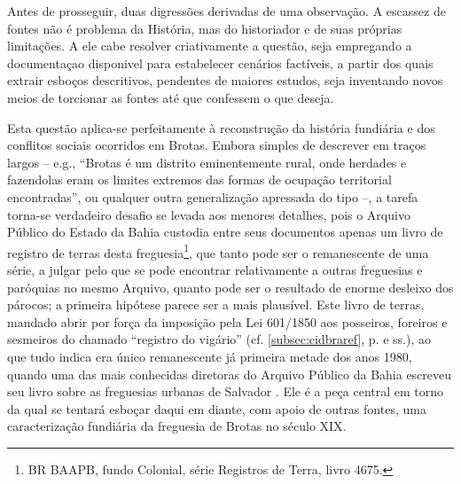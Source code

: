 Antes de prosseguir, duas digressões derivadas de uma observação. A escassez de fontes não é problema da História, mas do historiador e de suas próprias limitações. A ele cabe resolver criativamente a questão, seja empregando a documentaçao disponivel para estabelecer cenários factíveis, a partir dos quais extrair esboços descritivos, pendentes de maiores estudos, seja inventando novos meios de torcionar as fontes até que confessem o que deseja.

Esta questão aplica-se perfeitamente à reconstrução da história fundiária e dos conflitos sociais ocorridos em Brotas. Embora simples de descrever em traços largos -- e.g., ``Brotas é um distrito eminentemente rural, onde herdades e fazendolas eram os limites extremos das formas de ocupação territorial encontradas'', ou qualquer outra generalização apressada do tipo --, a tarefa torna-se verdadeiro desafio se levada aos menores detalhes, pois o Arquivo Público do Estado da Bahia custodia entre seus documentos apenas um livro de registro de terras desta freguesia\footnote{BR BAAPB, fundo Colonial, série Registros de Terra, livro 4675.}, que tanto pode ser o remanescente de uma série, a julgar pelo que se pode encontrar relativamente a outras freguesias e paróquias no mesmo Arquivo, quanto pode ser o resultado de enorme desleixo dos párocos; a primeira hipótese parece ser a mais plausível. Este livro de terras, mandado abrir por força da imposição pela Lei 601/1850 aos posseiros, foreiros e sesmeiros do chamado  ``registro do vigário'' (cf. \autoref{subsec:cidbraref}, p. \pageref{subsec:cidbraref} e ss.), ao que tudo indica era único remanescente já primeira metade dos anos 1980, quando uma das mais conhecidas diretoras do Arquivo Público da Bahia escreveu seu livro sobre as freguesias urbanas de Salvador \cite{NASCIMENTO2007}. Ele é a peça central em torno da qual se tentará esboçar daqui em diante, com apoio de outras fontes, uma caracterização fundiária da freguesia de Brotas no século XIX. 

